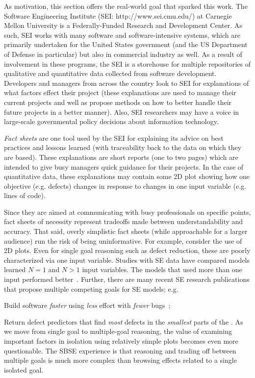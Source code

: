 
As motivation, this section  offers the real-world goal that
sparked this work.  The Software Engineering
Institute (SEI: http://www.sei.cmu.edu/) at Carnegie
Mellon University is a Federally-Funded Research and
Development Center. As such, SEI works with many
software and software-intensive systems, which are
primarily undertaken for the United States
government (and the US Department of Defense in
particular) but also in commercial industry as
well. As a result of involvement in these programs,
the SEI is a storehouse for multiple repositories of
qualitative and quantitative data collected from
software development.
Developers and managers from across the country look
to SEI for explanations of what factors effect their
project (these explanations are used to manage their
current projects and well as propose methods on how
to better handle their future projects in a better
manner).  Also, SEI researchers may have a
voice in large-scale governmental policy decisions about
information technology.

 
{\em Fact sheets} are one tool used by the SEI for explaining its advice
on best practices and lessons learned
(with
traceability back to the data on which they are
based).  These
explanations are short reports (one to two pages)  which are intended
to give busy managers quick guidance for their
projects. In the case of quantitative data, these
explanations may contain some 2D plot showing how
one objective (e.g. defects) changes in response to
changes in one input variable (e.g. lines of code).

 
Since they are aimed at communicating with busy
professionals on specific points, fact sheets of
necessity represent tradeoffs made between
understandability and accuracy. That said,
overly simplistic fact sheets
(while approachable for a larger audience) run the risk of being
uninformative. For example, consider the use of 2D plots.
Even for single goal
reasoning such as defect reduction, these are
poorly characterized via one input variable. Studies with SE
data have compared models learned  $N =
1$  and $N > 1$ input variables. The models that used
more than one input performed better~\cite{me07b}.
Further, there are many recent SE research publications that propose multiple competing
goals for SE models; e.g.
\bi
\item
Build software {\em faster} using {\em less} effort with {\em fewer} bugs~\cite{elrawas10};
\item
Return defect predictors that find {\em most} defects in the {\em smallest} parts of the 
\cite{arisholm6}.
\ei
As we move from single goal to multiple-goal reasoning, the value of examining important factors in isolation using relatively simple plots
becomes even more questionable. The SBSE experience is that reasoning and
trading off between multiple goals is much more complex than browsing effects related
to a single isolated goal.

